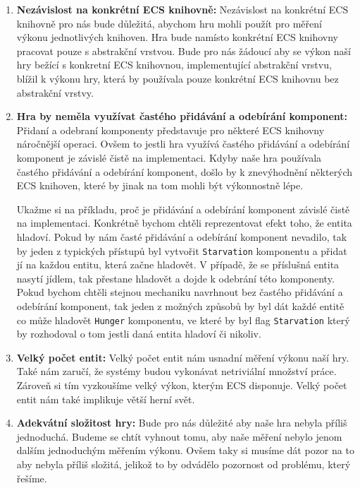 \begin{enumerate}
    \item \textbf{Nezávislost na konkrétní ECS knihovně:} Nezávislost na konkrétní ECS knihovně pro nás bude důležitá, abychom hru mohli použít pro měření výkonu jednotlivých knihoven. Hra bude namísto konkrétní ECS knihovny pracovat pouze s abstrakční vrstvou. Bude pro nás žádoucí aby se výkon naší hry bežící s konkretní ECS knihovnou, implementující abstrakční vrstvu, blížil k výkonu hry, která by používala pouze konkrétní ECS knihovnu bez abstrakční vrstvy.

    \item \textbf{Hra by neměla využívat častého přidávání a odebírání komponent:} Přidaní a odebraní komponenty představuje pro některé ECS knihovny náročnější operaci. Ovšem to jestli hra využívá častého přidávání a odebírání komponent je závislé čistě na implementaci. Kdyby naše hra používala častého přidávání a odebírání komponent, došlo by k znevýhodnění některých ECS knihoven, které by jinak na tom mohli být výkonnostně lépe.
    
    Ukažme si na příkladu, proč je přidávání a odebírání komponent závislé čistě na implementaci. Konkrétně bychom chtěli reprezentovat efekt toho, že entita hladoví. Pokud by nám časté přidávání a odebírání komponent nevadilo, tak by jeden z typických přístupů byl vytvořit \verb|Starvation| komponentu a přidat jí na každou entitu, která začne hladovět. V případě, že se příslušná entita nasytí jídlem, tak přestane hladovět a dojde k odebrání této komponenty. Pokud bychom chtěli stejnou mechaniku navrhnout bez častého přidávání a odebírání komponent, tak jeden z možných způsobů by byl dát každé entitě co může hladovět \texttt{Hunger} komponentu, ve které by byl flag \verb|Starvation| který by rozhodoval o tom jestli daná entita hladoví či nikoliv.
    
    \item \textbf{Velký počet entit:} Velký počet entit nám usnadní měření výkonu naší hry. Také nám zaručí, že systémy budou vykonávat netriviální množství práce. Zároveň si tím vyzkoušíme velký výkon, kterým ECS disponuje. Velký počet entit nám také implikuje větší herní svět.
    
    \item \textbf{Adekvátní složitost hry:} Bude pro nás důležité aby naše hra nebyla příliš jednoduchá. Budeme se chtít vyhnout tomu, aby naše měření nebylo jenom dalším jednoduchým měřením výkonu. Ovšem taky si musíme dát pozor na to aby nebyla příliš složitá, jelikož to by odvádělo pozornost od problému, který řešíme.
\end{enumerate}


